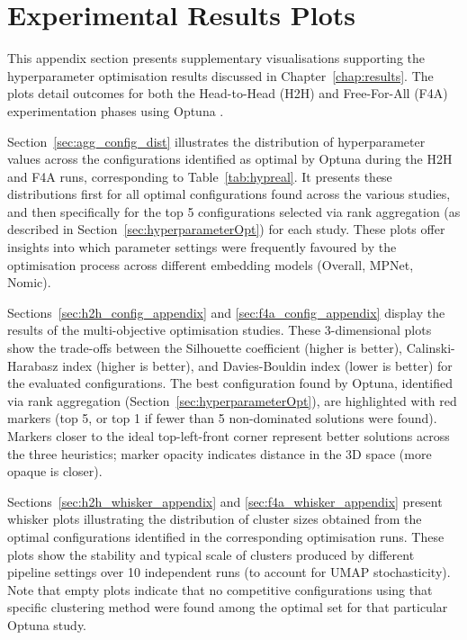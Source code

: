 \documentclass[10pt,oneside]{report}
\begin{document}
\clearpage

\section{Experimental Results Plots}\label{app:exp_results_plots}

This appendix section presents supplementary visualisations supporting the hyperparameter optimisation results discussed in Chapter~\ref{chap:results}. The plots detail outcomes for both the Head-to-Head (H2H) and Free-For-All (F4A) experimentation phases using Optuna \cite{akiba2019optuna}.

Section~\ref{sec:agg_config_dist} illustrates the distribution of hyperparameter values across the configurations identified as optimal by Optuna during the H2H and F4A runs, corresponding to Table~\ref{tab:hypreal}. It presents these distributions first for all optimal configurations found across the various studies, and then specifically for the top 5 configurations selected via rank aggregation (as described in Section~\ref{sec:hyperparameterOpt}) for each study. These plots offer insights into which parameter settings were frequently favoured by the optimisation process across different embedding models (Overall, MPNet, Nomic).

Sections~\ref{sec:h2h_config_appendix} and \ref{sec:f4a_config_appendix} display the results of the multi-objective optimisation studies. These 3-dimensional plots show the trade-offs between the Silhouette coefficient (higher is better), Calinski-Harabasz index (higher is better), and Davies-Bouldin index (lower is better) for the evaluated configurations. The best configuration found by Optuna, identified via rank aggregation (Section~\ref{sec:hyperparameterOpt}), are highlighted with red markers (top 5, or top 1 if fewer than 5 non-dominated solutions were found). Markers closer to the ideal top-left-front corner represent better solutions across the three heuristics; marker opacity indicates distance in the 3D space (more opaque is closer).

Sections~\ref{sec:h2h_whisker_appendix} and \ref{sec:f4a_whisker_appendix} present whisker plots illustrating the distribution of cluster sizes obtained from the optimal configurations identified in the corresponding optimisation runs. These plots show the stability and typical scale of clusters produced by different pipeline settings over 10 independent runs (to account for UMAP stochasticity). Note that empty plots indicate that no competitive configurations using that specific clustering method were found among the optimal set for that particular Optuna study.
\end{document}
